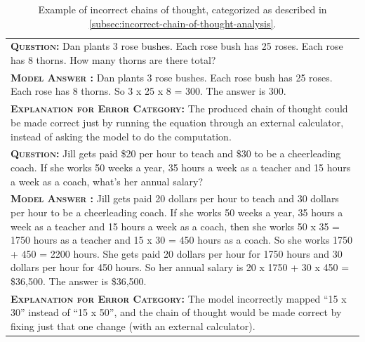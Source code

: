 \begingroup
\begin{table}[h]
    \caption{
    Example of incorrect chains of thought, categorized as described in \cref{subsec:incorrect-chain-of-thought-analysis}.
    }
    \centering
    \small
    \begin{tabular}{p{\linewidth}}
        \toprule
        \vspace{-2mm}
        \textbf{\textsc{Question:}} Dan plants 3 rose bushes. Each rose bush has 25 roses. Each rose has 8 thorns. How many thorns are there total? \\
        \vspace{-1mm}
        \textbf{\textsc{Model Answer \color{blue}{(incorrect; calculator error only)}:}} Dan plants 3 rose bushes. Each rose bush has 25 roses. Each rose has 8 thorns. So {\color{blue}3 x 25 x 8 = 300}. The answer is 300. \color{blue}{\xmark} \\
        \vspace{-1mm}
        \textbf{\textsc{Explanation for Error Category:}} The produced chain of thought could be made correct just by running the equation through an external calculator, instead of asking the model to do the computation. \\
        \midrule
        \vspace{-2mm}
        \textbf{\textsc{Question:}} Jill gets paid \$20 per hour to teach and \$30 to be a cheerleading coach. If she works 50 weeks a year, 35 hours a week as a teacher and 15 hours a week as a coach, what's her annual salary? \\
        \vspace{-1mm}
        \textbf{\textsc{Model Answer \color{blue}{(incorrect; symbol mapping error)}:}} Jill gets paid 20 dollars per hour to teach and 30 dollars per hour to be a cheerleading coach. If she works 50 weeks a year, 35 hours a week as a teacher and 15 hours a week as a coach, then she works 50 x 35 = 1750 hours as a teacher and {\color{blue}15 x 30} = 450 hours as a coach. So she works 1750 + 450 = 2200 hours. She gets paid 20 dollars per hour for 1750 hours and 30 dollars per hour for 450 hours. So her annual salary is 20 x 1750 + 30 x 450 = \$36,500. The answer is \$36,500.   \color{blue}{\xmark} \\
        \vspace{-1mm}
        \textbf{\textsc{Explanation for Error Category:}} The model incorrectly mapped ``15 x 30'' instead of ``15 x 50'', and the chain of thought would be made correct by fixing just that one change (with an external calculator). \\

\end{tabular}
\end{table}
